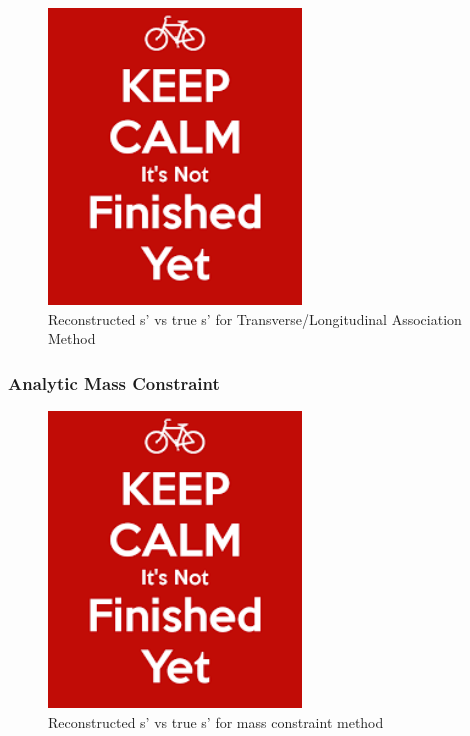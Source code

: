 \begin{figure}
  \centering
  \includegraphics[width=0.6\textwidth]{figures/dummy}
  \caption[Reconstructed s' vs true s' for Transverse/Longitudinal Association Method]{Reconstructed s' vs true s' for Transverse/Longitudinal Association Method}
  \label{fig:simpleAssoication}
\end{figure}

\subsubsection{Analytic Mass Constraint}

\begin{figure}
  \centering
  \includegraphics[width=0.6\textwidth]{figures/dummy}
  \caption[Reconstructed s' vs true s' for mass constraint method]{Reconstructed s' vs true s' for mass constraint method}
  \label{fig:MassConstraint}
\end{figure}

